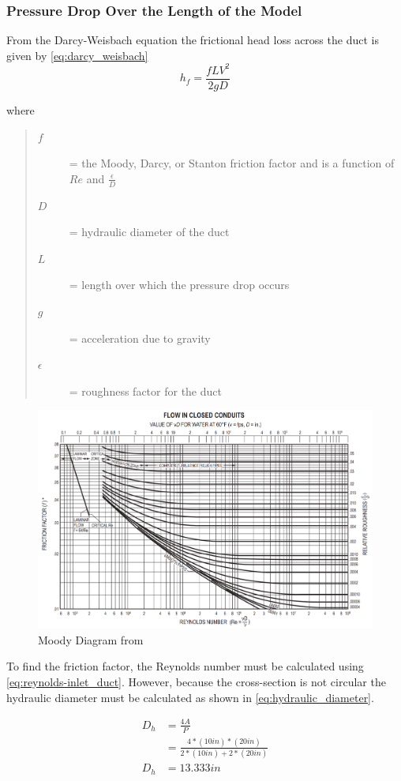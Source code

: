 \documentclass{article}
\begin{document}

\subsubsection{Pressure Drop Over the Length of the Model}

From the Darcy-Weisbach equation\cite{professional_engineer} the frictional head loss across the duct is given by \autoref{eq:darcy_weisbach}
\begin{equation}
	h_f = \frac{f L V^2}{2gD}
	\label{eq:darcy_weisbach}
\end{equation}

where
\begin{quote}
	\begin{description}
		\item[$f$] = the Moody, Darcy, or Stanton friction factor and is a function of $Re$ and $\frac{\epsilon}{D}$
		\item[$D$] = hydraulic diameter of the duct
		\item[$L$] = length over which the pressure drop occurs
		\item[$g$] = acceleration due to gravity
		\item[$\epsilon$] = roughness factor for the duct
	\end{description}
\end{quote}

\begin{figure}[h]
	\centering
	\includegraphics[width=0.5\linewidth]{img/hand_calcs/moody_diagram.png}
	\caption{Moody Diagram from }
	\label{fig:moody_diagram}
\end{figure}

To find the friction factor, the Reynolds number must be calculated using \autoref{eq:reynolds-inlet_duct}. However, because the cross-section is not circular the hydraulic diameter must be calculated as shown in \autoref{eq:hydraulic_diameter}.

\begin{equation}
	\begin{aligned}
		D_h & = \frac{4A}{P}                                    \\
		    & = \frac{4*(10 in)*(20 in)}{2*(10 in) + 2*(20 in)} \\
		D_h & = 13.333 in
	\end{aligned}
	\label{eq:hydraulic_diameter}
\end{equation}
\end{document}
